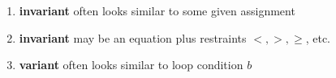 {%
%

\begin{enumerate}
\item \textbf{invariant} often looks similar to some given assignment
\item \textbf{invariant} may be an equation plus restraints $<,>,\geq$, etc.
\item \textbf{variant} often looks similar to loop condition $b$
\end{enumerate}
}
